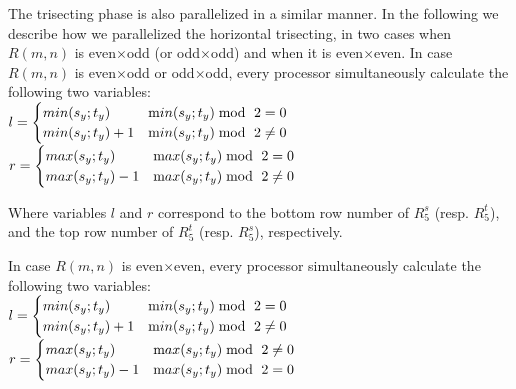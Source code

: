 \documentclass[preprint,12pt]{elsarticle}
\begin{document}
\par The trisecting phase is also parallelized in a similar manner. In the following we describe
how we parallelized the horizontal trisecting, in two cases when
$R(m,n)$ is even$\times$odd (or odd$\times$odd) and when it is
even$\times$even. In case $R(m,n)$
is even$\times$odd or odd$\times$odd, every processor simultaneously calculate the following two variables:\\
$l=
  \begin{cases}
  min(s_{y} ; t_{y}) \ & \text  min(s_{y} ; t_{y})\bmod\ 2 =
  0\\
   min(s_{y} ; t_{y})+1 & \text  min(s_{y} ; t_{y})\bmod\ 2 \neq
  0
  \end{cases}$\\
$r=
  \begin{cases}
  max(s_{y} ; t_{y}) \ & \text  max(s_{y} ; t_{y})\bmod\ 2 =
  0\\
  max(s_{y} ; t_{y})-1 & \text  max(s_{y} ; t_{y})\bmod\ 2 \neq
  0
  \end{cases}$\par
Where variables $l$ and $r$ correspond to the bottom row number of
$R^{s}_{5}$ (resp. $R^{t}_{5}$), and the top row number of
$R^{t}_{5}$ (resp. $R^{s}_{5}$), respectively.\par In case $R(m,n)$
is even$\times$even, every processor simultaneously calculate the
following two variables:
\\
$l=
  \begin{cases}
  min(s_{y} ; t_{y}) \ & \text  min(s_{y} ; t_{y})\bmod\ 2 =
  0\\
   min(s_{y} ; t_{y})+1 & \text  min(s_{y} ; t_{y})\bmod\ 2 \neq
  0
  \end{cases}$\\
$r=
  \begin{cases}
  max(s_{y} ; t_{y}) \ & \text  max(s_{y} ; t_{y})\bmod\ 2  \neq
  0\\
  max(s_{y} ; t_{y})-1 & \text  max(s_{y} ; t_{y})\bmod\ 2=
  0
  \end{cases}$\\
\end{document}
